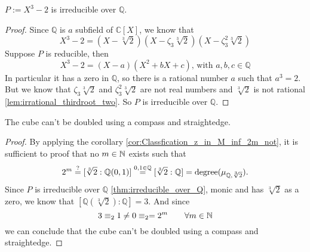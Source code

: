 \begin{lemma}
    $P := X^3 - 2$ is irreducible over $\mathbb{Q}$.
\label{lem:irreducible_over_Q}
\leanok
{}
\end{lemma}
\begin{proof}
    \leanok
    Since $\mathbb{Q}$ is $a$ subfield of $\mathbb{C} [X]$, we know that
    \begin{equation*}
        X^3 - 2 = (X - \sqrt[3]{2})(X -\zeta_3 \sqrt[3]{2})(X -\zeta_3^2 \sqrt[3]{2})
    \end{equation*}
    Suppose $P$ is reducible, then
    \begin{equation*}
        X^3 - 2 = (X - a)(X^2 + bX + c)\text{, with } a, b, c \in \mathbb{Q}
    \end{equation*}
    In particular it has a zero in $\mathbb{Q}$, so there is a rational number $a$ such that $a^3 = 2$.\newline
    But we know that $\zeta_3 \sqrt[3]{2}$ and $\zeta_3^2 \sqrt[3]{2}$ are not real numbers and $\sqrt[3]{2}$ is not rational \ref{lem:irrational_thirdroot_two}.
    So $P$ is irreducible over $\mathbb{Q}$.
\end{proof}

\begin{theorem}
    \label{thm:third_root_of_two_not_in_M_inf}
    \leanok
    The cube can't be doubled using a compass and straightedge.
\end{theorem}
\begin{proof}
    \leanok
    By applying the corollary \ref{cor:Classfication_z_in_M_inf_2m_not}, it is sufficient to proof that no $m\in \mathbb{N}$ exists such that
    $$2^m\overset{?}{=}[\sqrt[3]{2}:\mathbb{Q}({0,1})]\overset{0,1\in\mathbb{Q}}{=} [\sqrt[3]{2}:\mathbb{Q}] = \text{degree}(\mu_{\mathbb{Q},\sqrt[3]{2}}).$$
    Since $P$ is irreducible over $\mathbb{Q}$ \ref{thm:irreducible_over_Q}, monic and has $\sqrt[3]{2}$ as a zero, we know that $[\mathbb{Q}(\sqrt[3]{2}):\mathbb{Q}] = 3$.
    And since $$ 3  \equiv_2 1 \neq 0  \equiv_2 = 2^m \qquad\forall m \in \mathbb{N}$$
    we can conclude that the cube can't be doubled using a compass and straightedge.
    
\end{proof}

